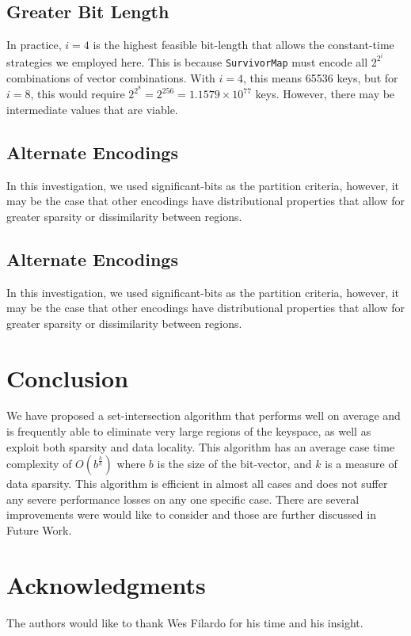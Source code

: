 \documentclass[11pt,letterpaper]{article}
\begin{document}
\subsection{Greater Bit Length}
In practice, $i=4$ is the highest feasible bit-length that allows the constant-time
strategies we employed here.  This is because {\tt SurvivorMap} must encode
all $2^{2^i}$ combinations of vector combinations.  With $i=4$, this means
65536 keys, but for $i=8$, this would require $2^{2^8}=2^256=1.1579\times10^{77}$
keys.  However, there may be intermediate values that are viable.

\subsection{Alternate Encodings}
In this investigation, we used significant-bits as the partition criteria,
however, it may be the case that other encodings have distributional properties
that allow for greater sparsity or dissimilarity between regions.

\subsection{Alternate Encodings}
In this investigation, we used significant-bits as the partition criteria,
however, it may be the case that other encodings have distributional properties
that allow for greater sparsity or dissimilarity between regions.


\section{Conclusion}
We have proposed a set-intersection algorithm that performs well
on average and is frequently able to eliminate very large regions of
the keyspace, as well as exploit both sparsity and data locality.  
This algorithm has an average case time complexity of
$O\left(b^{\frac{k}{b}}\right)$ where $b$ is the size of the bit-vector,
and $k$ is a measure of data sparsity. This algorithm is efficient in almost
all cases and does not suffer any severe performance losses on any one
specific case. There are several improvements were would like to consider
and those are further discussed in Future Work.

\section*{Acknowledgments}
The authors would like to thank Wes Filardo for his time and his insight.



\end{document}
